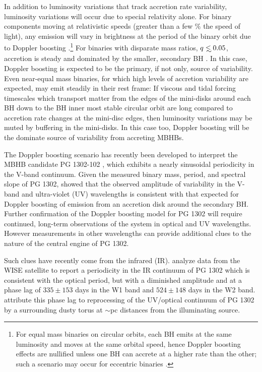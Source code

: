 In addition to luminosity variations that track accretion rate variability,
luminosity variations will occur due to special relativity alone. For binary
components moving at relativistic speeds (greater than a few $\%$ the speed of
light), any emission will vary in brightness at the period of the binary orbit
due to Doppler boosting \citep{PG1302MNRAS:2015a,
PG1302Nature:2015b}.\footnote{For equal mass binaries on circular orbits, each
BH emits at the same luminosity and moves at the same orbital speed, hence
Doppler boosting effects are nullified unless one BH can accrete at a higher
rate than the other; such a scenario may occur for eccentric binaries
\citep{MunozLai:2016}.}  For binaries with disparate mass ratios, $q \lsim
0.05$, accretion is steady and dominated by the smaller, secondary BH
\citep{DHM:2013:MNRAS, Farris:2014}. In this case, Doppler boosting is expected
to be the primary, if not only, source of variability. Even near-equal mass
binaries, for which high levels of accretion variability are expected, may
emit steadily in their rest frame: If viscous and tidal forcing timescales
which transport matter from the edges of the mini-disks around each BH down to
the BH inner most stable circular orbit are long compared to accretion rate
changes at the mini-disc edges, then luminosity variations may be muted by
buffering in the mini-disks. In this case too, Doppler boosting will be the
dominate source of variability from accreting MBHBs.



The Doppler boosting scenario has recently been developed to interpret the
MBHB candidate PG 1302-102 \citep{Graham+2015a}, which exhibits a nearly
sinusoidal periodicity in the V-band continuum. Given the measured binary
mass, period, and spectral slope of PG 1302, \cite{PG1302Nature:2015b} showed
that the observed amplitude of variability in the V-band and ultra-violet (UV)
wavelengths is consistent with that expected for Doppler boosting of emission
from an accretion disk around the secondary BH. Further confirmation of the
Doppler boosting model for PG 1302 will require continued, long-term
observations of the system in optical and UV wavelengths. However measurements
in other wavelengths can provide additional clues to the nature of the central
engine of PG 1302.

Such clues have recently come from the infrared (IR). \cite{Jun:2015} analyze
data from the WISE satellite to report a periodicity in the IR continuum of PG
1302 which is consistent with the optical period, but with a diminished
amplitude and at a phase lag of $335 \pm 153$ days in the W1 band and $524 \pm
148$ days in the W2 band. \cite{Jun:2015} attribute this phase lag to reprocessing of the
UV/optical continuum of PG 1302 by a surrounding dusty torus at $\sim$pc
distances from the illuminating source.

